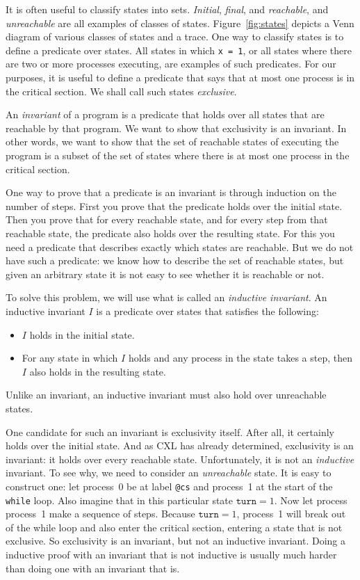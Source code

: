 \documentclass{report}
\begin{document}
It is often useful to classify states into sets.
\emph{Initial}, \emph{final}, and \emph{reachable}, and \emph{unreachable}
are all examples of classes of states.
Figure~\ref{fig:states} depicts a Venn diagram of various classes of states
and a trace.
One way to classify states is to define a predicate over states.
All states in which \texttt{x = 1}, or all states where
there are two or more processes executing, are examples of such predicates.
For our purposes, it is useful to define a predicate that says that at
most one process is in the critical section.  We shall call such states
\emph{exclusive}.

An \emph{invariant} of a program
is a predicate that holds over all states that are reachable by that program.
We want to show that exclusivity is an invariant.
In other words, we want to show that the set of reachable states of executing
the program
is a subset of the set of states where there is at most one process in the critical
section.

One way to prove that a predicate is an invariant is through induction
on the number of steps.  First you prove that the predicate holds over
the initial state.  Then you prove that for every reachable state,
and for every step from that reachable state, the predicate also holds
over the resulting state.
For this you need a predicate that describes exactly which
states are reachable.
But we do not have such a predicate: we know how to describe the set
of reachable states, but given an arbitrary state it is not easy to
see whether it is reachable or not.

To solve this problem, we will use what is called an
\emph{inductive invariant}.
An inductive invariant $I$ is a predicate over states that satisfies the following:
\begin{itemize}
\item $I$ holds in the initial state.
\item For any state in which $I$ holds and any process in the
state takes a step, then $I$ also holds in the resulting state.
\end{itemize}
Unlike an invariant, an inductive invariant must also hold over unreachable states.

One candidate for such an invariant is exclusivity itself.
After all, it certainly holds over the initial state.
And as CXL has already determined, exclusivity is an invariant:
it holds over every reachable state.
Unfortunately, it is not an \emph{inductive} invariant.
To see why, we need to consider an \emph{unreachable} state.
It is easy to construct one: let process~0 be at label \texttt{@cs}
and process~1 at the start of the \texttt{while} loop.
Also imagine that in this particular state $\mathtt{turn} = 1$.  Now let
process process~1 make a sequence of steps.  Because $\mathtt{turn} = 1$,
process~1 will break out of the while loop and also enter the critical
section, entering a state that is not exclusive.
So exclusivity is an invariant, but not an inductive invariant.
Doing a inductive proof with an invariant that is not inductive is usually
much harder than doing one with an invariant that is.
\end{document}
